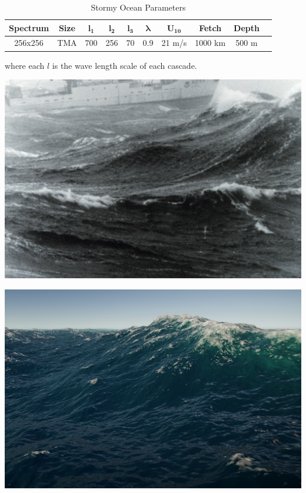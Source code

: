 \begin{table}[h]
    \centering
    \begin{tabular}{|c|c|c|c|c|c|c|c|c|c|}
        \hline
        \textbf{Spectrum} & \textbf{Size} & $\mathbf{l_1}$ & $\mathbf{l_2}$ & $\mathbf{l_3}$ & $\mathbf{\lambda}$ & $\mathbf{U_{10}}$ & \textbf{Fetch} & \textbf{Depth} \\
        \hline
        256x256 & TMA & 700 & 256 & 70 & 0.9 & 21 m/s & 1000 km & 500 m \\
        \hline
    \end{tabular}
    \caption{Stormy Ocean Parameters}
    \label{tab:stormy_ocean}
\end{table}

where each $l$ is the wave length scale of each cascade.

\begin{minipage}{0.48\textwidth}
    \centering
    \includegraphics[width=1\textwidth]{"images/real_stormy_ocean.png"}
    \captionsetup{justification=centering}
    \label{fig:real_stormy_ocean}
\end{minipage}
\hfill
\begin{minipage}{0.48\textwidth}
    \centering
    \includegraphics[width=1\textwidth]{"images/fake_stormy_ocean.png"}
    \label{fig:fake_stormy_ocean}
\end{minipage}
